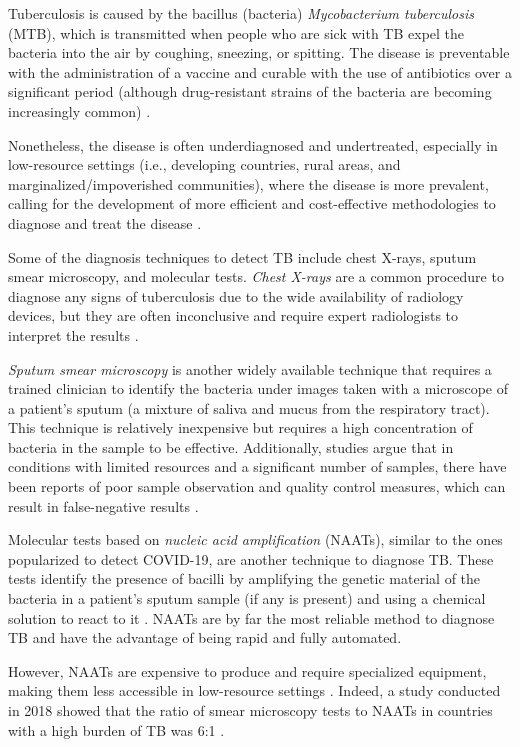 \documentclass[../main.tex]{subfiles}
\begin{document}
    Tuberculosis is caused by the bacillus (bacteria) \textit{Mycobacterium tuberculosis} (MTB), which is transmitted when people who are sick with TB expel the bacteria into the air by coughing, sneezing, or spitting. The disease is preventable with the administration of a vaccine and curable with the use of antibiotics over a significant period (although drug-resistant strains of the bacteria are becoming increasingly common) \cite{who_tuberculosis_2023}.
    
    Nonetheless, the disease is often underdiagnosed and undertreated, especially in low-resource settings (i.e., developing countries, rural areas, and marginalized/impoverished communities), where the disease is more prevalent, calling for the development of more efficient and cost-effective methodologies to diagnose and treat the disease \cite{who_global_2022, imi_era4tb_2020,  who_tuberculosis_2023}.

    Some of the diagnosis techniques to detect TB include chest X-rays, sputum smear microscopy, and molecular tests. \textit{Chest X-rays} are a common procedure to diagnose any signs of tuberculosis due to the wide availability of radiology devices, but they are often inconclusive and require expert radiologists to interpret the results \cite{escalante_tuberculosis_2009}.
    
    \textit{Sputum smear microscopy} is another widely available technique that requires a trained clinician to identify the bacteria under images taken with a microscope of a patient's sputum (a mixture of saliva and mucus from the respiratory tract). This technique is relatively inexpensive but requires a high concentration of bacteria in the sample to be effective. Additionally, studies argue that in conditions with limited resources and a significant number of samples, there have been reports of poor sample observation and quality control measures, which can result in false-negative results \cite{desikan_sputum_2013}.
    
    Molecular tests based on \textit{nucleic acid amplification} (NAATs), similar to the ones popularized to detect COVID-19, are another technique to diagnose TB. These tests identify the presence of bacilli by amplifying the genetic material of the bacteria in a patient's sputum sample (if any is present) and using a chemical solution to react to it \cite{cdc_tb_2016}. NAATs are by far the most reliable method to diagnose TB and have the advantage of being rapid and fully automated. 
    
    However, NAATs are expensive to produce and require specialized equipment, making them less accessible in low-resource settings \cite{albert_development_2016, maclean_advances_2020}. Indeed, a study conducted in 2018 showed that the ratio of smear microscopy tests to NAATs in countries with a high burden of TB was 6:1 \cite{cazabon_market_2018, maclean_advances_2020}.
\end{document}
